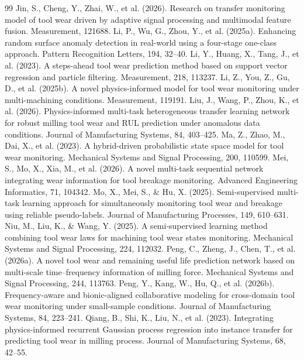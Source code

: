 \documentclass[a4paper,fleqn]{cas-sc}
\begin{document}
\begin{thebibliography}{99}
     Jin, S., Cheng, Y., Zhai, W., et al. (2026). Research on transfer monitoring model of tool wear driven by adaptive signal processing and multimodal feature fusion. Measurement, 121688.
     Li, P., Wu, G., Zhou, Y., et al. (2025a). Enhancing random surface anomaly detection in real-world using a four-stage one-class approach. Pattern Recognition Letters, 194, 32--40.
     Li, Y., Huang, X., Tang, J., et al. (2023). A steps-ahead tool wear prediction method based on support vector regression and particle filtering. Measurement, 218, 113237.
     Li, Z., You, Z., Gu, D., et al. (2025b). A novel physics-informed model for tool wear monitoring under multi-machining conditions. Measurement, 119191.
     Liu, J., Wang, P., Zhou, K., et al. (2026). Physics-informed multi-task heterogeneous transfer learning network for robust milling tool wear and RUL prediction under anomalous data conditions. Journal of Manufacturing Systems, 84, 403--425.
     Ma, Z., Zhao, M., Dai, X., et al. (2023). A hybrid-driven probabilistic state space model for tool wear monitoring. Mechanical Systems and Signal Processing, 200, 110599.
     Mei, S., Mo, X., Xia, M., et al. (2026). A novel multi-task sequential network integrating wear information for tool breakage monitoring. Advanced Engineering Informatics, 71, 104342.
     Mo, X., Mei, S., \& Hu, X. (2025). Semi-supervised multi-task learning approach for simultaneously monitoring tool wear and breakage using reliable pseudo-labels. Journal of Manufacturing Processes, 149, 610--631.
     Niu, M., Liu, K., \& Wang, Y. (2025). A semi-supervised learning method combining tool wear laws for machining tool wear states monitoring. Mechanical Systems and Signal Processing, 224, 112032.
     Peng, C., Zheng, J., Chen, T., et al. (2026a). A novel tool wear and remaining useful life prediction network based on multi-scale time--frequency information of milling force. Mechanical Systems and Signal Processing, 244, 113763.
     Peng, Y., Kang, W., Hu, Q., et al. (2026b). Frequency-aware and bionic-aligned collaborative modeling for cross-domain tool wear monitoring under small-sample conditions. Journal of Manufacturing Systems, 84, 223--241.
     Qiang, B., Shi, K., Liu, N., et al. (2023). Integrating physics-informed recurrent Gaussian process regression into instance transfer for predicting tool wear in milling process. Journal of Manufacturing Systems, 68, 42--55.

\end{thebibliography}
\end{document}
